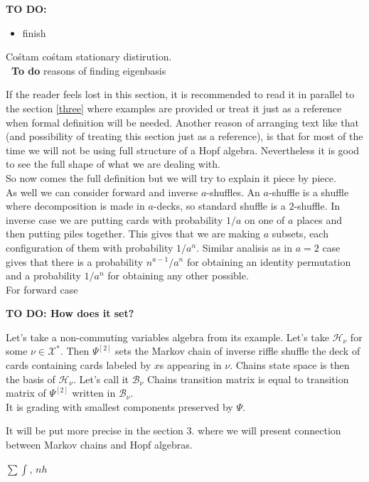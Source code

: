 \documentclass[a4paper]{article}
\newcommand{\todo}[1]{\hfill \break \textbf{\Huge TO DO: #1 \hfill \break}\normalsize}
\newcommand{\smalltodo}[1]{\textbf{\ To do}}
\begin{document}
\todo{}
\begin{itemize}
\item finish
\end{itemize}

Cośtam cośtam stationary distirution. \\
\smalltodo \\
reasons of finding eigenbasis

If the reader feels lost in this section, it is recommended to read it in parallel to the section \ref{three}
where examples are provided or treat it just as a reference when formal definition will be needed.
Another reason of arranging text like that (and possibility of treating this section just as a reference),
is that for most of the time we will not be using full structure of a Hopf algebra. Nevertheless it is good
to see the full shape of what we are dealing with. \\
So now comes the full definition but we will try to explain it piece by piece. \\[8pt]

As well we can consider forward and inverse $a$-shuffles. An $a$-shuffle is a shuffle where decomposition
is made in $a$-decks, so standard shuffle is a $2$-shuffle. In inverse case we are putting cards with
probability $1/a$ on one of $a$ places and then putting piles together. This gives that we are making
$a$ subsets, each configuration of them with probability $1/a^n$. Similar analisis as in $a = 2$ case
gives that there is a probability $n^{a-1}/a^n$ for obtaining an identity permutation and a
probability $1/a^n$ for obtaining any other possible. \\
For forward case

\todo{How does it set?}

Let's take a non-commuting variables algebra from its example. Let's take $\mathcal{H}_\nu$ for some
$\nu \in \mathcal{X}^*$. Then $\Psi^{[2]}$ sets the Markov chain of inverse riffle shuffle the deck of cards
containing cards labeled by $x$s appearing in $\nu$. Chains state space is then the basis of
$\mathcal{H}_\nu$. Let's call it $\mathcal{B}_\nu$
Chains transition matrix is equal to transition matrix of $\Psi^{[2]}$ written in $\mathcal{B}_\nu$.  \\

It is grading with smallest components preserved by $\Psi$.

It will be put more
precise in the section 3. where we will present connection between Markov chains and Hopf algebras.

$\sum\!\!\!\!\!\int$, $n\!\!\!h$
\end{document}
